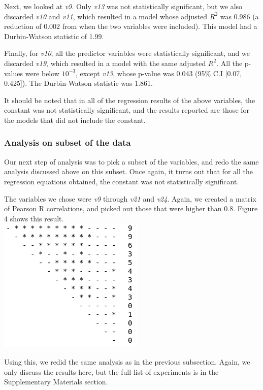 \documentclass[12pt,a4paper,twocolumn]{article}
\begin{document}
	Next, we looked at \textit{v9}. Only \textit{v13} was not statistically significant, but we also discarded \textit{v10} and \textit{v11}, which resulted in a model whose adjusted $R^2$ was 0.986 (a reduction of 0.002 from when the two variables were included). This model had a Durbin-Watson statistic of 1.99.
	
	Finally, for \textit{v10}, all the predictor variables were statistically significant, and we discarded \textit{v19}, which resulted in a model with the same adjusted $R^2$. All the p-values were below $10^{-3}$, except \textit{v13}, whose p-value was 0.043 (95\% C.I [0.07, 0.425]). The Durbin-Watson statistic was 1.861.
	
	It should be noted that in all of the regression results of the above variables, the constant was not statistically significant, and the results reported are those for the models that did not include the constant.
	
	\subsubsection{Analysis on subset of the data}
	Our next step of analysis was to pick a subset of the variables, and redo the same analysis discussed above on this subset. Once again, it turns out that for all the regression equations obtained, the constant was not statistically significant.
	
	The variables we chose were \textit{v9} through \textit{v21} and \textit{v24}. Again, we created a matrix of Pearson R correlations, and picked out those that were higher than 0.8. Figure 4 shows this result. \\
	
	\includegraphics[scale=0.6]{fig4.png}
	\begingroup
	\endgroup
	\hfill\break
	
	Using this, we redid the same analysis as in the previous subsection. Again, we only discuss the results here, but the full list of experiments is in the Supplementary Materials section.
	
\end{document}
